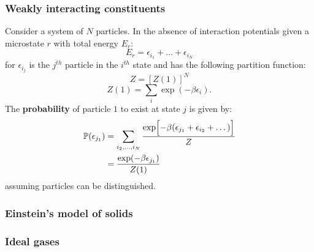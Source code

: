 \documentclass{article}
\begin{document}
\begin{multicols*}{3}
\subsubsection*{Weakly interacting constituents}
Consider a system of $N$ particles.
In the absence of interaction potentials given a microstate
$r$ with total energy $E_r$:
$$E_r=\epsilon_{i_1}+\dots+\epsilon_{i_N}$$
for $\epsilon_{i_j}$ is the $j^{th}$ particle in the $i^{th}$ state
and has the following partition function:
$$Z=[Z(1)]^N$$
$$Z(1)=\sum_i\exp(-\beta\epsilon_i).$$
The \textbf{probability} of particle $1$ to exist at 
state $j$ is given by:
\begin{align*}
    \mathbb{P}(\epsilon_{j_1})
    &=\sum_{i_2,\dots,i_N}\frac{\exp\Bigl[-\beta
    (\epsilon_{j_1}+\epsilon_{i_2}+\dots)\Bigr]}{Z} \\
    &=\frac{\exp(-\beta\epsilon_{j_1})}{Z(1)}
\end{align*}
assuming particles can be distinguished.

\subsubsection*{Einstein's model of solids}

\subsubsection*{Ideal gases}

\end{multicols*}
\end{document}
